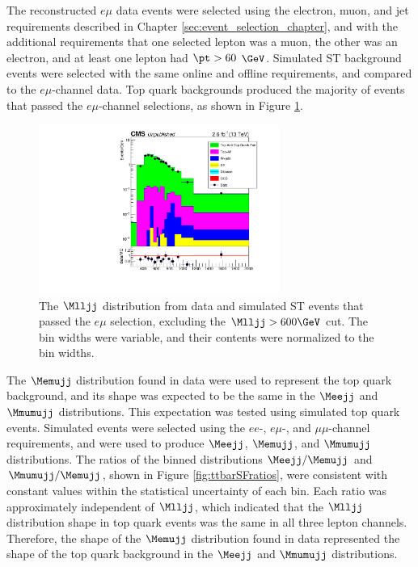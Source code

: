 The reconstructed $e\mu$ data events were selected using the electron, muon, and jet requirements described 
in Chapter \ref{sec:event_selection_chapter}, and with the additional requirements that one selected lepton was a 
muon, the other was an electron, and at least one lepton had $\pt > 60$ $\GeV$.  Simulated ST background events were selected with the 
same online and offline requirements, and compared to the $e\mu$-channel data.  Top quark backgrounds 
produced the majority of events that passed the $e\mu$-channel selections, as shown in Figure \ref{fig:dataAndSimsInEMuChannel}.  

\begin{figure}[h]
	\centering
	\includegraphics[width=0.7\textwidth]{figures/Mlljj_eMuChannel_log.pdf}
	\caption{The $\Mlljj$ distribution from data and simulated ST events that passed the $e\mu$ selection, excluding 
	the $\Mlljj > 600 \GeV$ cut.  The bin widths were variable, and their contents were normalized to the bin widths.}
	\label{fig:dataAndSimsInEMuChannel}
\end{figure}

The $\Memujj$ distribution found in data were used to represent the top quark background, and its shape was expected 
to be the same in the $\Meejj$ and $\Mmumujj$ distributions.  This expectation was tested using simulated 
top quark events.  Simulated events were selected using the $ee$-, $e\mu$-, and $\mu\mu$-channel requirements, and were used 
to produce $\Meejj$, $\Memujj$, and $\Mmumujj$ distributions.  The ratios of the binned distributions $\Meejj / \Memujj$ 
and $\Mmumujj / \Memujj$, shown in Figure \ref{fig:ttbarSFratios}, were consistent with constant values within 
the statistical uncertainty of each bin.  Each ratio was approximately independent of $\Mlljj$, which indicated that the $\Mlljj$ 
distribution shape in top quark events was the same in all three lepton channels.  Therefore, the shape of 
the $\Memujj$ distribution found in data represented the shape of the top quark background in the $\Meejj$ 
and $\Mmumujj$ distributions.

